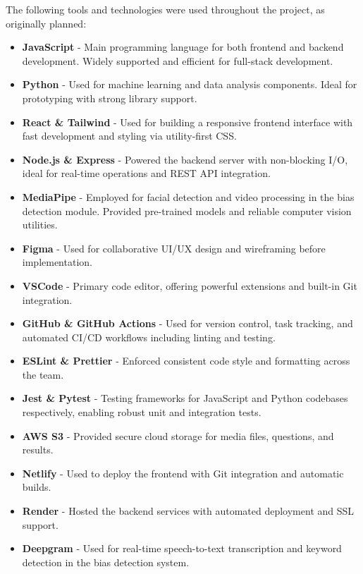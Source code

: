 \documentclass{article}
\begin{document}
The following tools and technologies were used throughout the project, as originally planned:

\begin{itemize}
    \item \textbf{JavaScript} - Main programming language for both frontend and backend development. 
    Widely supported and efficient for full-stack development.
    
    \item \textbf{Python} - Used for machine learning and data analysis components. 
    Ideal for prototyping with strong library support.
    
    \item \textbf{React \& Tailwind} - Used for building a responsive frontend interface with fast development 
    and styling via utility-first CSS.
    
    \item \textbf{Node.js \& Express} - Powered the backend server with non-blocking I/O, 
    ideal for real-time operations and REST API integration.
    
    \item \textbf{MediaPipe} - Employed for facial detection and video processing in the bias detection module. 
    Provided pre-trained models and reliable computer vision utilities.
    
    \item \textbf{Figma} - Used for collaborative UI/UX design and wireframing before implementation.
    
    \item \textbf{VSCode} - Primary code editor, offering powerful extensions and built-in Git integration.
    
    \item \textbf{GitHub \& GitHub Actions} - Used for version control, task tracking, and automated CI/CD workflows 
    including linting and testing.
    
    \item \textbf{ESLint \& Prettier} - Enforced consistent code style and formatting across the team.
    
    \item \textbf{Jest \& Pytest} - Testing frameworks for JavaScript and Python codebases respectively, 
    enabling robust unit and integration tests.
    
    \item \textbf{AWS S3} - Provided secure cloud storage for media files, questions, and results.
    
    \item \textbf{Netlify} - Used to deploy the frontend with Git integration and automatic builds.
    
    \item \textbf{Render} - Hosted the backend services with automated deployment and SSL support.
    
    \item \textbf{Deepgram} - Used for real-time speech-to-text transcription and keyword detection in the 
    bias detection system.
\end{itemize}
\end{document}
